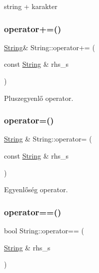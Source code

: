 string + karakter 

\mbox{\label{class_string_ac203e7c52e04bb86f62f9dd75527b361}} 
\subsubsection{\texorpdfstring{operator+=()}{operator+=()}}
{\footnotesize\ttfamily \mbox{\hyperlink{class_string}{String}}\& String\+::operator+= (\begin{DoxyParamCaption}\item[{const \mbox{\hyperlink{class_string}{String}} \&}]{rhs\+\_\+s }\end{DoxyParamCaption})\hspace{0.3cm}{\ttfamily [inline]}}



Pluszegyenlő operator. 

\mbox{\label{class_string_a803e6112834d4c0cdb0da6c6a4000e6e}} 
\subsubsection{\texorpdfstring{operator=()}{operator=()}}
{\footnotesize\ttfamily \mbox{\hyperlink{class_string}{String}} \& String\+::operator= (\begin{DoxyParamCaption}\item[{const \mbox{\hyperlink{class_string}{String}} \&}]{rhs\+\_\+s }\end{DoxyParamCaption})}



Egyenlőség operator. 

\mbox{\label{class_string_a1006dbb8a123aed87b8edb33d5cbcee4}} 
\subsubsection{\texorpdfstring{operator==()}{operator==()}\hspace{0.1cm}{\footnotesize\ttfamily [1/2]}}
{\footnotesize\ttfamily bool String\+::operator== (\begin{DoxyParamCaption}\item[{\mbox{\hyperlink{class_string}{String}} \&}]{rhs\+\_\+s }\end{DoxyParamCaption})}



